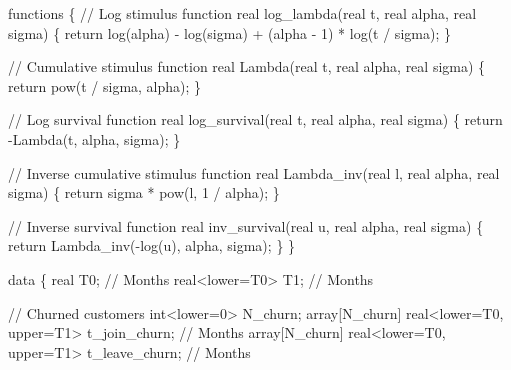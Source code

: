 \documentclass[
  letterpaper,
  DIV=11,
  numbers=noendperiod]{scrartcl}
\newenvironment{Shaded}{\begin{snugshade}}{\end{snugshade}}
\newcommand{\CommentTok}[1]{\textcolor[rgb]{0.37,0.37,0.37}{#1}}
\newcommand{\ControlFlowTok}[1]{\textcolor[rgb]{0.00,0.23,0.31}{#1}}
\newcommand{\DataTypeTok}[1]{\textcolor[rgb]{0.68,0.00,0.00}{#1}}
\newcommand{\DecValTok}[1]{\textcolor[rgb]{0.68,0.00,0.00}{#1}}
\newcommand{\KeywordTok}[1]{\textcolor[rgb]{0.00,0.23,0.31}{#1}}
\newcommand{\NormalTok}[1]{\textcolor[rgb]{0.00,0.23,0.31}{#1}}
\begin{document}
\begin{codelisting}

\caption{\texttt{model3.stan}}

\begin{Shaded}
\begin{Highlighting}[]
\KeywordTok{functions}\NormalTok{ \{}
  \CommentTok{// Log stimulus function}
  \DataTypeTok{real}\NormalTok{ log\_lambda(}\DataTypeTok{real}\NormalTok{ t, }\DataTypeTok{real}\NormalTok{ alpha, }\DataTypeTok{real}\NormalTok{ sigma) \{}
    \ControlFlowTok{return}\NormalTok{ log(alpha) {-} log(sigma) + (alpha {-} }\DecValTok{1}\NormalTok{) * log(t / sigma);}
\NormalTok{  \}}
  
  \CommentTok{// Cumulative stimulus function}
  \DataTypeTok{real}\NormalTok{ Lambda(}\DataTypeTok{real}\NormalTok{ t, }\DataTypeTok{real}\NormalTok{ alpha, }\DataTypeTok{real}\NormalTok{ sigma) \{}
    \ControlFlowTok{return}\NormalTok{ pow(t / sigma, alpha);}
\NormalTok{  \}}

  \CommentTok{// Log survival function}
  \DataTypeTok{real}\NormalTok{ log\_survival(}\DataTypeTok{real}\NormalTok{ t, }\DataTypeTok{real}\NormalTok{ alpha, }\DataTypeTok{real}\NormalTok{ sigma) \{}
    \ControlFlowTok{return}\NormalTok{ {-}Lambda(t, alpha, sigma);}
\NormalTok{  \}}

  \CommentTok{// Inverse cumulative stimulus function}
  \DataTypeTok{real}\NormalTok{ Lambda\_inv(}\DataTypeTok{real}\NormalTok{ l, }\DataTypeTok{real}\NormalTok{ alpha, }\DataTypeTok{real}\NormalTok{ sigma) \{}
    \ControlFlowTok{return}\NormalTok{ sigma * pow(l, }\DecValTok{1}\NormalTok{ / alpha);}
\NormalTok{  \}}
  
  \CommentTok{// Inverse survival function}
  \DataTypeTok{real}\NormalTok{ inv\_survival(}\DataTypeTok{real}\NormalTok{ u, }\DataTypeTok{real}\NormalTok{ alpha, }\DataTypeTok{real}\NormalTok{ sigma) \{}
    \ControlFlowTok{return}\NormalTok{ Lambda\_inv({-}log(u), alpha, sigma);}
\NormalTok{  \}}
\NormalTok{\}}

\KeywordTok{data}\NormalTok{ \{}
  \DataTypeTok{real}\NormalTok{           T0; }\CommentTok{// Months}
  \DataTypeTok{real}\NormalTok{\textless{}}\KeywordTok{lower}\NormalTok{=T0\textgreater{} T1; }\CommentTok{// Months}

  \CommentTok{// Churned customers}
  \DataTypeTok{int}\NormalTok{\textless{}}\KeywordTok{lower}\NormalTok{=}\DecValTok{0}\NormalTok{\textgreater{} N\_churn;}
  \DataTypeTok{array}\NormalTok{[N\_churn] }\DataTypeTok{real}\NormalTok{\textless{}}\KeywordTok{lower}\NormalTok{=T0, }\KeywordTok{upper}\NormalTok{=T1\textgreater{} t\_join\_churn;  }\CommentTok{// Months}
  \DataTypeTok{array}\NormalTok{[N\_churn] }\DataTypeTok{real}\NormalTok{\textless{}}\KeywordTok{lower}\NormalTok{=T0, }\KeywordTok{upper}\NormalTok{=T1\textgreater{} t\_leave\_churn; }\CommentTok{// Months}


\end{Highlighting}
\end{Shaded}
\end{codelisting}
\end{document}
